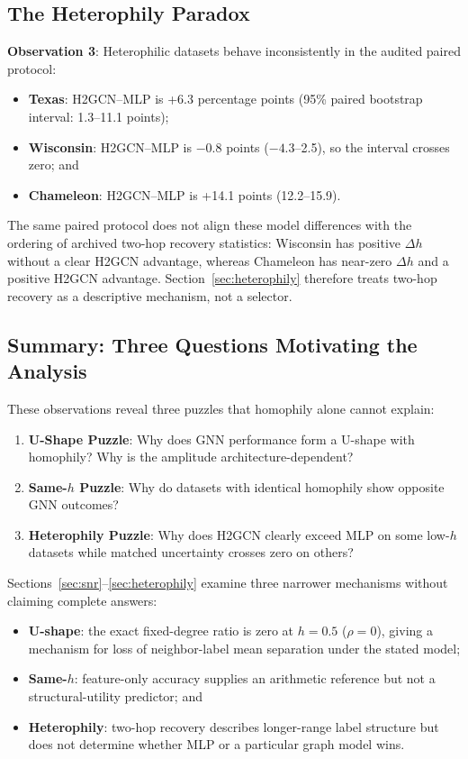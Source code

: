 \subsection{The Heterophily Paradox}

\textbf{Observation 3}: Heterophilic datasets behave inconsistently in the audited paired protocol:
\begin{itemize}
    \item \textbf{Texas}: H2GCN--MLP is +6.3 percentage points (95\% paired bootstrap interval: 1.3--11.1 points);
    \item \textbf{Wisconsin}: H2GCN--MLP is $-0.8$ points ($-4.3$--2.5), so the interval crosses zero; and
    \item \textbf{Chameleon}: H2GCN--MLP is +14.1 points (12.2--15.9).
\end{itemize}

The same paired protocol does not align these model differences with the ordering of archived two-hop recovery statistics: Wisconsin has positive $\Delta h$ without a clear H2GCN advantage, whereas Chameleon has near-zero $\Delta h$ and a positive H2GCN advantage. Section~\ref{sec:heterophily} therefore treats two-hop recovery as a descriptive mechanism, not a selector.

\subsection{Summary: Three Questions Motivating the Analysis}

These observations reveal three puzzles that homophily alone cannot explain:

\begin{enumerate}
    \item \textbf{U-Shape Puzzle}: Why does GNN performance form a U-shape with homophily? Why is the amplitude architecture-dependent?

    \item \textbf{Same-$h$ Puzzle}: Why do datasets with identical homophily show opposite GNN outcomes?

    \item \textbf{Heterophily Puzzle}: Why does H2GCN clearly exceed MLP on some low-$h$ datasets while matched uncertainty crosses zero on others?
\end{enumerate}

Sections~\ref{sec:snr}--\ref{sec:heterophily} examine three narrower mechanisms without claiming complete answers:
\begin{itemize}
    \item \textbf{U-shape}: the exact fixed-degree ratio is zero at $h=0.5$ ($\rho=0$), giving a mechanism for loss of neighbor-label mean separation under the stated model;
    \item \textbf{Same-$h$}: feature-only accuracy supplies an arithmetic reference but not a structural-utility predictor; and
    \item \textbf{Heterophily}: two-hop recovery describes longer-range label structure but does not determine whether MLP or a particular graph model wins.
\end{itemize}
